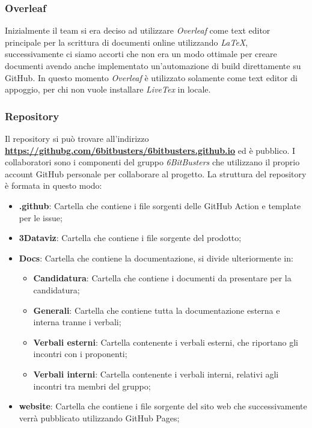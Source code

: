         \subsubsection{Overleaf}
        Inizialmente il team si era deciso ad utilizzare \textit{Overleaf} come text editor principale per la scrittura di documenti online utilizzando \textit{LaTeX}, successivamente ci siamo accorti
        che non era un modo ottimale per creare documenti avendo anche implementato un'automazione di build direttamente su GitHub.
        In questo momento \textit{Overleaf} è utilizzato solamente come text editor di appoggio, per chi non vuole installare \textit{LiveTex} in locale.
        
        
        \subsubsection{Repository}
        Il repository si può trovare all'indirizzo \textbf{\url{https://githubg.com/6bitbusters/6bitbusters.github.io}} ed è pubblico.
        I collaboratori sono i componenti del gruppo \textit{6BitBusters} che utilizzano il proprio account GitHub
        personale per collaborare al progetto.
        La struttura del repository è formata in questo modo:
            \begin{itemize}
                \item \textbf{ .github}: Cartella che contiene i file sorgenti delle GitHub Action e template per le issue;
                \item \textbf{3Dataviz}: Cartella che contiene i file sorgente del prodotto;
                \item \textbf{Docs}: Cartella che contiene la documentazione, si divide ulteriormente in:
                    \begin{itemize}
                        \item \textbf{Candidatura}: Cartella che contiene i documenti da presentare per la candidatura;
                        \item \textbf{Generali}: Cartella che contiene tutta la documentazione esterna e interna tranne i verbali;
                        \item \textbf{Verbali esterni}: Cartella contenente i verbali esterni, che riportano gli incontri con i proponenti;
                        \item \textbf{Verbali interni}: Cartella contenente i verbali interni, relativi agli incontri tra membri del gruppo;
                    \end{itemize}
                \item \textbf{website}: Cartella che contiene i file sorgente del sito web che successivamente verrà pubblicato utilizzando GitHub Pages;
            \end{itemize}
